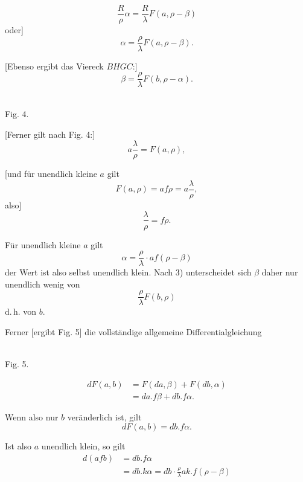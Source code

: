%
\[
\frac{R}{\rho}\alpha = \frac{R}{\lambda} F(a, \rho-\beta)
\]
oder]
\[
\tag*{2)} \alpha = \frac{\rho}{\lambda} F(a, \rho-\beta).
\]

[Ebenso ergibt das Viereck $BHGC$:]
\[
\tag*{3)} \beta = \frac{\rho}{\lambda} F(b, \rho-\alpha).
\]

\begin{center}\begin{minipage}{\linewidth}\centering\\[3pt]Fig. 4.\end{minipage}\end{center}

[Ferner gilt nach Fig. 4:]
\[
\tag*{4)} a\frac{\lambda}{\rho} = F(a, \rho),
\]

[und für unendlich kleine $a$ gilt
\[
F(a,\rho) = af\rho = a\frac{\lambda}{\rho},
\]
also]
\[
\tag*{5)} \frac{\lambda}{\rho} = f\rho.
\]

Für unendlich kleine $a$ gilt
\[
\alpha = \frac{\rho}{\lambda}\cdot af(\rho-\beta)
\]
der Wert ist also selbst unendlich klein. Nach 3) unterscheidet sich $\beta$ daher nur unendlich wenig von
\[
\frac{\rho}{\lambda} F(b,\rho)
\]
d.\,h. von $b$.

Ferner [ergibt Fig. 5] die vollständige allgemeine Differentialgleichung

\begin{center}\begin{minipage}{\linewidth}\centering\\[3pt]Fig. 5.\end{minipage}\end{center}

\[
\tag*{6)} \begin{aligned}dF(a,b) &= F(da,\beta) + F(db,\alpha)\\ &= da.f\beta + db.f\alpha.\end{aligned}
\]

Wenn also nur $b$ veränderlich ist, gilt
\[
dF(a,b) = db.f\alpha.
\]

Ist also $a$ unendlich klein, so gilt
\[
\begin{aligned}d(afb) &= db.f\alpha\\ &= db.k\alpha = db\cdot\frac{\rho}{\lambda}ak.f(\rho-\beta)\end{aligned}
\]
